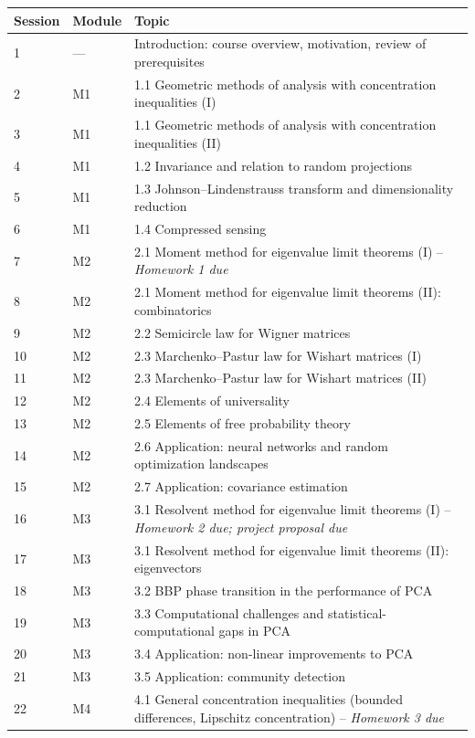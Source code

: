 \documentclass[11pt]{article}
\begin{document}
\begin{longtable}{p{1.4cm}p{1.4cm}p{9.5cm}}
\toprule
\textbf{Session} & \textbf{Module} & \textbf{Topic} \\
\midrule
\endhead
1 & --- & Introduction: course overview, motivation, review of prerequisites \\
2 & M1 & 1.1 Geometric methods of analysis with concentration inequalities (I) \\
3 & M1 & 1.1 Geometric methods of analysis with concentration inequalities (II) \\
4 & M1 & 1.2 Invariance and relation to random projections \\
5 & M1 & 1.3 Johnson--Lindenstrauss transform and dimensionality reduction \\
6 & M1 & 1.4 Compressed sensing \\
7 & M2 & 2.1 Moment method for eigenvalue limit theorems (I) -- \emph{Homework 1 due} \\
8 & M2 & 2.1 Moment method for eigenvalue limit theorems (II): combinatorics \\
9 & M2 & 2.2 Semicircle law for Wigner matrices \\
10 & M2 & 2.3 Marchenko--Pastur law for Wishart matrices (I) \\
11 & M2 & 2.3 Marchenko--Pastur law for Wishart matrices (II) \\
12 & M2 & 2.4 Elements of universality \\
13 & M2 & 2.5 Elements of free probability theory \\
14 & M2 & 2.6 Application: neural networks and random optimization landscapes \\
15 & M2 & 2.7 Application: covariance estimation \\
16 & M3 & 3.1 Resolvent method for eigenvalue limit theorems (I) -- \emph{Homework 2 due; project proposal due} \\
17 & M3 & 3.1 Resolvent method for eigenvalue limit theorems (II): eigenvectors \\
18 & M3 & 3.2 BBP phase transition in the performance of PCA \\
19 & M3 & 3.3 Computational challenges and statistical-computational gaps in PCA \\
20 & M3 & 3.4 Application: non-linear improvements to PCA \\
21 & M3 & 3.5 Application: community detection \\
22 & M4 & 4.1 General concentration inequalities (bounded differences, Lipschitz concentration) -- \emph{Homework 3 due} \\

\end{longtable}
\end{document}

